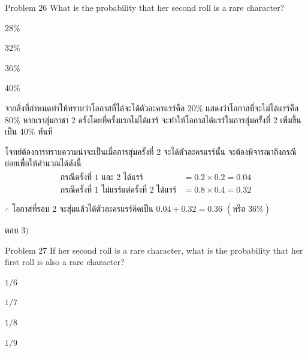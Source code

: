 \documentclass[11pt]{scrartcl}
\begin{document}
\begin{problembox}{Problem 26}
What is the probability that her second roll is a rare character?
 
\begin{choices}
\item 28\%
\item 32\%
\item 36\%
\item 40\%
\end{choices}
\end{problembox}

\begin{solutionbox}
  จากสิ่งที่กำหนดทำให้ทราบว่าโอกาสที่ได้จะได้ตัวละครแรร์คือ 20\% แสดงว่าโอกาสที่จะไม่ได้แรร์คือ 80\%
  หากเราสุ่มกาชา 2 ครั้งโดยที่ครั้งแรกไม่ได้แรร์ จะทำให้โอกาสได้แรร์ในการสุ่มครั้งที่ 2 เพิ่มขึ้นเป็น 40\% ทันที

  โจทย์ต้องการทราบความน่าจะเป็นเมื่อการสุ่มครั้งที่ 2 จะได้ตัวละครแรร์นั้น จะต้องพิจารณาถึงกรณีย่อยเพื่อให้คำนวณได้ดังนี้
  \begin{align*}
    \text{กรณีครั้งที่ 1 และ 2 ได้แรร์} &= 0.2 \times 0.2 = 0.04 \\
    \text{กรณีครั้งที่ 1 ไม่แรร์แต่ครั้งที่ 2 ได้แรร์} &= 0.8 \times 0.4 = 0.32
  \end{align*}
  
  $\therefore$ โอกาสที่รอบ 2 จะสุ่มแล้วได้ตัวละครแรร์คิดเป็น $0.04+0.32=0.36$ $(\text{หรือ } 36\%)$

  ตอบ $\boxed{3)}$
\end{solutionbox}

\begin{problembox}{Problem 27}
If her second roll is a rare character, what is the probability that her first roll is also a rare character?
 
\begin{choices}
\item $1/6$
\item $1/7$
\item $1/8$
\item $1/9$
\end{choices}
\end{problembox}
 
\end{document}
